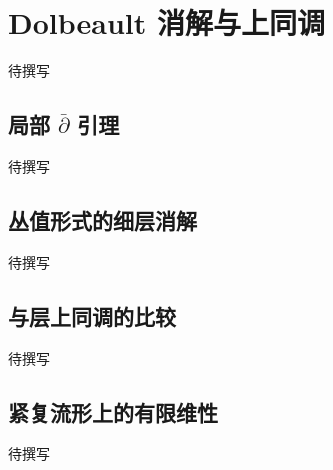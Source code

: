 
% 
% 

\section{Dolbeault 消解与上同调}
\label{g4:sec:1602}

待撰写

\subsection{\texorpdfstring{局部 \(\bar{\partial}\) 引理}{局部 \={∂} 引理}}
\label{g4:subsec:1602:01}
待撰写

\subsection{丛值形式的细层消解}
\label{g4:subsec:1602:02}
待撰写

\subsection{与层上同调的比较}
\label{g4:subsec:1602:03}
待撰写

\subsection{紧复流形上的有限维性}
\label{g4:subsec:1602:04}
待撰写
